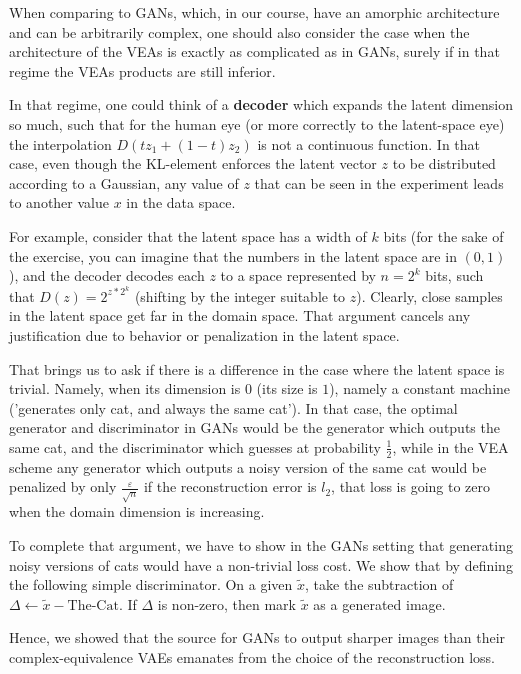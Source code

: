 \documentclass{article}
\begin{document}
When comparing to GANs, which, in our course, have an amorphic architecture and can be arbitrarily complex, one should also consider the case when the architecture of the VEAs is exactly as complicated as in GANs, surely if in that regime the VEAs products are still inferior.

In that regime, one could think of a \textbf{decoder} which expands the latent dimension so much, such that for the human eye (or more correctly to the latent-space eye) the interpolation $D(tz_{1} + (1-t)z_{2})$ is not a continuous function. In that case, even though the KL-element enforces the latent vector $z$ to be distributed according to a Gaussian, any value of $z$ that can be seen in the experiment leads to another value $x$ in the data space.

For example, consider that the latent space has a width of $k$ bits (for the sake of the exercise, you can imagine that the numbers in the latent space are in $(0,1)$), and the decoder decodes each $z$ to a space represented by $n = 2^{k}$ bits, such that $D(z) = 2^{ z * 2^{k} }$ (shifting by the integer suitable to $z$). Clearly, close samples in the latent space get far in the domain space. That argument cancels any justification due to behavior or penalization in the latent space.

That brings us to ask if there is a difference in the case where the latent space is trivial. Namely, when its dimension is $0$ (its size is $1$), namely a constant machine ('generates only cat, and always the same cat'). In that case, the optimal generator and discriminator in GANs would be the generator which outputs the same cat, and the discriminator which guesses at probability $\frac{1}{2}$, while in the VEA scheme any generator which outputs a noisy version of the same cat would be penalized by only $\frac{\varepsilon}{\sqrt{n}}$ if the reconstruction error is $l_2$, that loss is going to zero when the domain dimension is increasing. 

To complete that argument, we have to show in the GANs setting that generating noisy versions of cats would have a non-trivial loss cost. We show that by defining the following simple discriminator. On a given $\tilde{x}$, take the subtraction of $\Delta \leftarrow \tilde{x} - \text{The-Cat}$. If $\Delta$ is non-zero, then mark $\tilde{x}$ as a generated image.

Hence, we showed that the source for GANs to output sharper images than their complex-equivalence VAEs emanates from the choice of the reconstruction loss.


\end{document}
